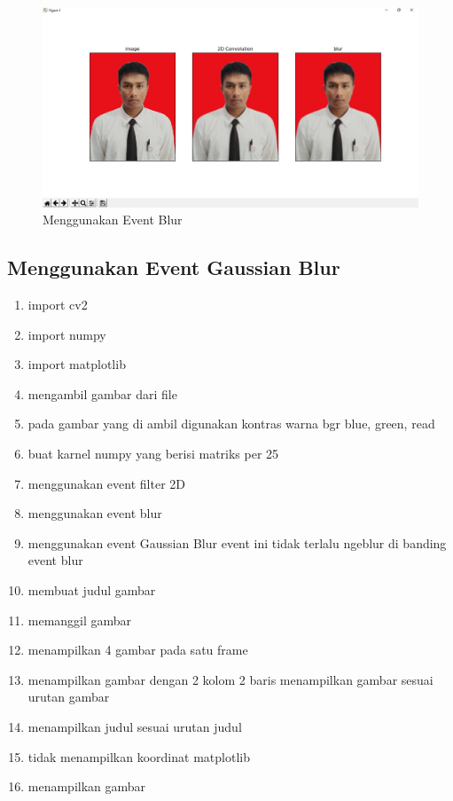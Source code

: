 \begin{figure}[ht]
\centering
\includegraphics[scale=0.35]{figures/2,60.jpg}
\caption{Menggunakan Event Blur}
\label{contoh}
\end{figure}







\newpage
\subsection{Menggunakan Event Gaussian Blur}

\begin{enumerate}
	\item import cv2
	\item import numpy
	\item import matplotlib
	\item mengambil gambar dari file
	\item pada gambar yang di ambil digunakan kontras warna bgr blue, green, read
	\item buat karnel numpy yang berisi matriks per 25
	\item menggunakan event filter 2D
	\item menggunakan event blur
	\item menggunakan event Gaussian Blur event ini tidak terlalu ngeblur di banding event blur
	\item membuat judul gambar
	\item memanggil gambar
	\item menampilkan 4 gambar pada satu frame
	\item menampilkan gambar dengan 2 kolom 2 baris menampilkan gambar sesuai urutan gambar
	\item menampilkan judul sesuai urutan judul
	\item tidak menampilkan koordinat matplotlib
	\item menampilkan gambar
\end{enumerate}

